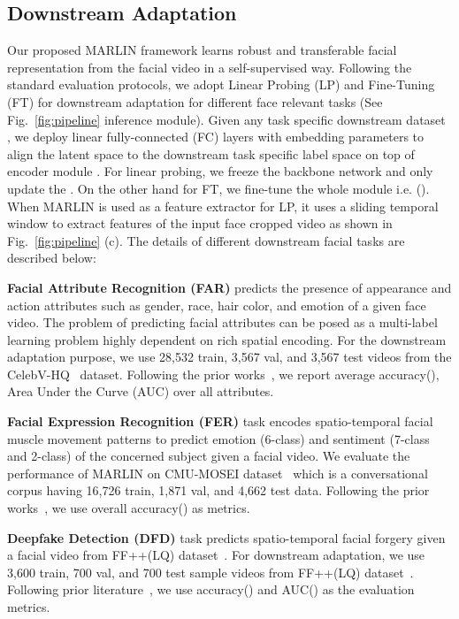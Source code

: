 \documentclass[10pt,twocolumn,letterpaper]{article}
\newcommand{\encoder}{}
\begin{document}
\subsection{Downstream Adaptation}\label{sec:downstream}

Our proposed MARLIN framework learns robust and transferable facial representation from the facial video in a self-supervised way. Following the standard evaluation protocols, we adopt Linear Probing (LP) and Fine-Tuning (FT) for downstream adaptation for different face relevant tasks (See Fig.~\ref{fig:pipeline} inference module). Given any task specific downstream dataset , we deploy linear fully-connected (FC) layers with embedding parameters  to align the latent space to the downstream task specific label space on top of encoder module \encoder. For linear probing, we freeze the backbone network \encoder and only update the . On the other hand for FT, we fine-tune the whole module i.e. (\encoder ). When MARLIN is used as a feature extractor for LP, it uses a sliding temporal window to extract features  of the input face cropped video  as shown in Fig.~\ref{fig:pipeline} (c). The details of different downstream facial tasks are described below:

\noindent \textbf{Facial Attribute Recognition (FAR)} predicts the presence of appearance and action attributes such as gender, race, hair color, and emotion of a given face video. The problem of predicting facial attributes can be posed as a multi-label learning problem highly dependent on rich spatial encoding. For the downstream adaptation purpose, we use 28,532 train, 3,567 val, and 3,567 test videos from the CelebV-HQ~\cite{zhuCelebVHQ2022} dataset. Following the prior works~\cite{liuDeep2015,ghoshAutomatic2018a,zhengGeneral2022}, we report average accuracy(), Area Under the Curve (AUC) over all attributes.  

\noindent \textbf{Facial Expression Recognition (FER)} task encodes spatio-temporal facial muscle movement patterns to predict emotion (6-class) and sentiment (7-class and 2-class) of the concerned subject given a facial video. We evaluate the performance of MARLIN on CMU-MOSEI dataset~\cite{bagherzadehMultimodal2018} which is a conversational corpus having 16,726 train, 1,871 val, and 4,662 test data. Following the prior works~\cite{delbrouckTransformerbased2020,bagherzadehMultimodal2018}, we use overall accuracy() as metrics.

\noindent \textbf{Deepfake Detection (DFD)} task predicts spatio-temporal facial forgery given a facial video from FF++(LQ) dataset~\cite{rosslerFaceForensics2019}. For downstream adaptation, we use 3,600 train, 700 val, and 700 test sample videos from FF++(LQ) dataset~\cite{rosslerFaceForensics2019}. Following prior literature~\cite{qianThinking2020,wangM2TR2022,caiYou2022}, we use accuracy() and AUC() as the evaluation metrics.
\end{document}
